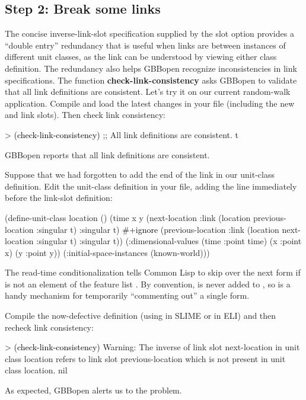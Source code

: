 \documentclass[10pt,twoside,english,pdftex]{article}
\begin{document}
\subsection*{Step 2: Break some links}

The concise inverse-link-slot specification supplied by the
 slot option provides a ``double entry'' redundancy that
is useful when links are between instances of different unit classes,
as the link can be understood by viewing either class definition.  The
redundancy also helps GBBopen recognize inconsistencies in link
specifications.  The function \textbf{check-link-consistency} asks
GBBopen to validate that all link definitions are consistent.  Let's
try it on our current random-walk application.  Compile and load the
latest changes in your  file (including
the new  and  link slots).
Then check link consistency:
%
\begin{example}\color{darkergray}%
  > \textcolor{black}{(check-link-consistency)}
  ;; All link definitions are consistent.
  t
\end{example}
%
GBBopen reports that all link definitions are consistent.

Suppose that we had forgotten to add the  end
of the link in our  unit-class definition. Edit the
 unit-class definition in your
 file, adding the line 
immediately before the  link-slot definition:
%
\begin{example}\color{darkergray}%
  (define-unit-class location ()
    (time 
     x y
     (next-location
      :link (location previous-location :singular t) 
      :singular t)
      \textcolor{black}{\#+ignore}     
     (previous-location
      :link (location next-location :singular t)  
      :singular t))
    (:dimensional-values
      (time :point time)
      (x :point x)
      (y :point y))
    (:initial-space-instances (known-world)))
\end{example}

The  read-time conditionalization tells Common Lisp to
skip over the next form if  is not an element of the
feature list .  By convention,  is never
added to , so  is a handy mechanism
for temporarily ``commenting out'' a single form.

Compile the now-defective definition (using  in SLIME or
 in ELI) and then recheck link consistency:
%
\begin{example}\color{darkergray}%
  > \textcolor{black}{(check-link-consistency)}
  Warning: The inverse of link slot next-location in unit class location 
           refers to link slot previous-location which is not present in 
           unit class location.
  nil
\end{example}
%
As expected, GBBopen alerts us to the problem.
\end{document}
